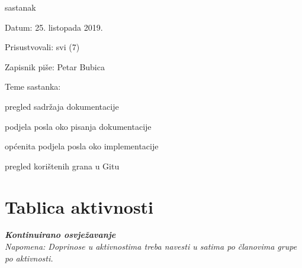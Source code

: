\begin{packed_enum}
			\pagebreak

			\item  sastanak
			\item[] \begin{packed_item}
				\item Datum: 25. listopada 2019.
				\item Prisustvovali: svi (7)
				\item Zapisnik piše: Petar Bubica
				\item Teme sastanka:
				\begin{packed_item}
					\item pregled sadržaja dokumentacije
					\item podjela posla oko pisanja dokumentacije
					\item općenita podjela posla oko implementacije
					\item pregled korištenih grana u Gitu
				\end{packed_item}
			\end{packed_item}

			
		\end{packed_enum}
		
		\eject
		\section*{Tablica aktivnosti}
		
			\textbf{\textit{Kontinuirano osvježavanje}}\\
			
			 \textit{Napomena: Doprinose u aktivnostima treba navesti u satima po članovima grupe po aktivnosti.}
					
